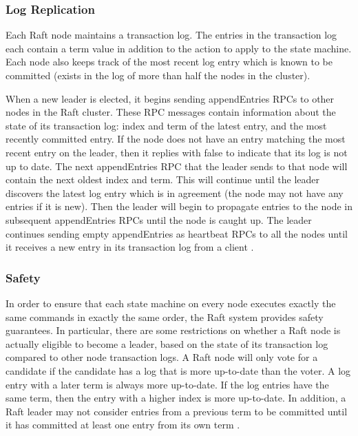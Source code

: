 \documentclass[9pt]{extarticle}
\begin{document}
\begin{multicols}{2}
\subsubsection{Log Replication}

Each Raft node maintains a transaction log. The entries in the
transaction log each contain a term value in addition to the action to
apply to the state machine. Each node also keeps track of the most
recent log entry which is known to be committed (exists in the log of
more than half the nodes in the cluster).

When a new leader is elected, it begins sending appendEntries RPCs
to other nodes in the Raft cluster. These RPC messages contain
information about the state of its transaction log: index and term of
the latest entry, and the most recently committed entry. If the node
does not have an entry matching the most recent entry on the leader,
then it replies with false to indicate that its log is not up to
date. The next appendEntries RPC that the leader sends to that
node will contain the next oldest index and term. This will continue
until the leader discovers the latest log entry which is in agreement
(the node may not have any entries if it is new). Then the leader will
begin to propagate entries to the node in subsequent appendEntries
RPCs until the node is caught up. The leader continues sending
empty appendEntries as heartbeat RPCs to all the nodes until it
receives a new entry in its transaction log from a client
\cite[Section~3.5]{raft_thesis:ongaro14}.

\subsubsection{Safety}

In order to ensure that each state machine on every node executes
exactly the same commands in exactly the same order, the Raft system
provides safety guarantees. In particular, there are some restrictions
on whether a Raft node is actually eligible to become a leader, based on
the state of its transaction log compared to other node transaction
logs. A Raft node will only vote for a candidate if the candidate has
a log that is more up-to-date than the voter. A log entry with a later
term is always more up-to-date. If the log entries have the same term,
then the entry with a higher index is more up-to-date. In addition,
a Raft leader may not consider entries from a previous term to be
committed until it has committed at least one entry from its own
term
\cite[Section~3.6]{raft_thesis:ongaro14}.


\end{multicols}
\end{document}

